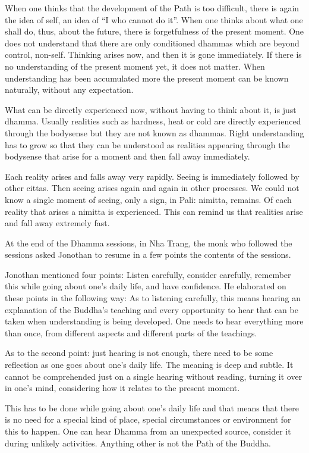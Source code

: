 {When one thinks that the development of the Path is too
difficult, there is again the idea of self, an idea of ``I who cannot do
it''. When one thinks about what one shall do, thus, about the future,
there is forgetfulness of the present moment. One does not understand
that there are only conditioned dhammas which are beyond control,
non-self. Thinking arises now, and then it is gone immediately. If there
is no understanding of the present moment yet, it does not matter. When
understanding has been accumulated more the present moment can be known
naturally, without any expectation. 

What can be directly experienced now, without having to think
about it, is just dhamma. Usually realities such as hardness, heat or
cold are directly experienced through the bodysense but they are not
known as dhammas. Right understanding has to grow so that they can be
understood as realities appearing through the bodysense that arise for a
moment and then fall away immediately. 

Each reality arises and falls away very rapidly. Seeing is
immediately followed by other cittas. Then seeing arises again and again
in other processes. We could not know a single moment of seeing, only a
sign, in Pali: nimitta, remains. Of each reality that arises a nimitta
is experienced. This can remind us that realities arise and fall away
extremely fast.

At the end of the Dhamma sessions, in Nha Trang, the monk who
followed the sessions asked Jonothan to resume in a few points the
contents of the sessions. 

Jonothan mentioned four points: Listen carefully, consider
carefully, remember this while going about one's daily life, and have
confidence. He elaborated on these points in the following way:
 As to listening carefully, this means hearing an explanation
of the Buddha's teaching and every opportunity to hear that can be taken
when understanding is being developed. One needs to hear everything more
than once, from different aspects and different parts of the teachings.


As to the second point: just hearing is not enough, there
need to be some reflection as one goes about one's daily life. The
meaning is deep and subtle. It cannot be comprehended just on a single
hearing without reading, turning it over in one's mind, considering how
it relates to the present moment. 

This has to be done while going about one's daily life and
that means that there is no need for a special kind of place, special
circumstances or environment for this to happen. One can hear Dhamma
from an unexpected source, consider it during unlikely activities.
Anything other is not the Path of the Buddha. 

}
